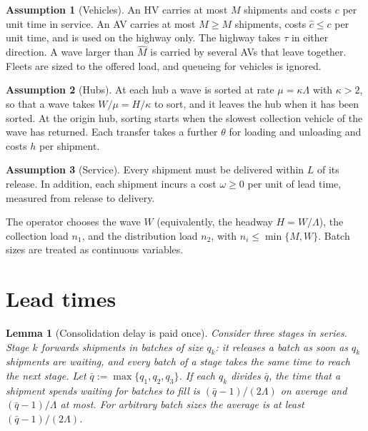 \documentclass[10pt, reqno]{amsart}
\newtheorem{lemma}[proposition]{Lemma}
\theoremstyle{definition}
\newtheorem{assumption}{Assumption}
\begin{document}
\begin{assumption}[Vehicles]\label{as:veh}
An HV carries at most $M$ shipments and costs $c$ per unit time in service. An AV carries at most $\hat M\ge M$ shipments, costs $\hat c\le c$ per unit time, and is used on the highway only. The highway takes $\tau$ in either direction. A wave larger than $\hat M$ is carried by several AVs that leave together. Fleets are sized to the offered load, and queueing for vehicles is ignored.
\end{assumption}

\begin{assumption}[Hubs]\label{as:hub}
At each hub a wave is sorted at rate $\mu=\kappa\Lambda$ with $\kappa>2$, so that a wave takes $W/\mu=H/\kappa$ to sort, and it leaves the hub when it has been sorted. At the origin hub, sorting starts when the slowest collection vehicle of the wave has returned. Each transfer takes a further $\theta$ for loading and unloading and costs $h$ per shipment.
\end{assumption}

\begin{assumption}[Service]\label{as:time}
Every shipment must be delivered within $L$ of its release. In addition, each shipment incurs a cost $\omega\ge0$ per unit of lead time, measured from release to delivery.
\end{assumption}

The operator chooses the wave $W$ (equivalently, the headway $H=W/\Lambda$), the collection load $n_1$, and the distribution load $n_2$, with $n_i\le\min\{M,W\}$. Batch sizes are treated as continuous variables.

\section{Lead times}

\begin{lemma}[Consolidation delay is paid once]\label{lem:delay}
Consider three stages in series. Stage $k$ forwards shipments in batches of size $q_k$: it releases a batch as soon as $q_k$ shipments are waiting, and every batch of a stage takes the same time to reach the next stage. Let $\bar q:=\max\{q_1,q_2,q_3\}$. If each $q_k$ divides $\bar q$, the time that a shipment spends waiting for batches to fill is $(\bar q-1)/(2\Lambda)$ on average and $(\bar q-1)/\Lambda$ at most. For arbitrary batch sizes the average is at least $(\bar q-1)/(2\Lambda)$.
\end{lemma}
\end{document}
